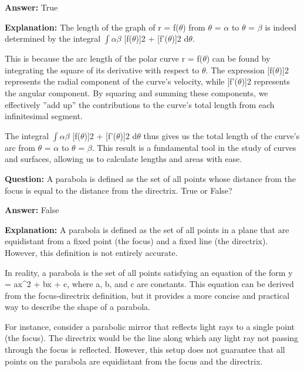 \documentclass{article}
\begin{document}
                \textbf{Answer:} True

                \textbf{Explanation:} The length of the graph of r = f(\ensuremath{\theta}) from \ensuremath{\theta} = \ensuremath{\alpha} to \ensuremath{\theta} = \ensuremath{\beta} is indeed determined by the integral \ensuremath{\int}\ensuremath{\alpha}\ensuremath{\beta} [f(\ensuremath{\theta})]2 + [f'(\ensuremath{\theta})]2 d\ensuremath{\theta}.

This is because the arc length of the polar curve r = f(\ensuremath{\theta}) can be found by integrating the square of its derivative with respect to \ensuremath{\theta}. The expression [f(\ensuremath{\theta})]2 represents the radial component of the curve's velocity, while [f'(\ensuremath{\theta})]2 represents the angular component. By squaring and summing these components, we effectively ''add up'' the contributions to the curve's total length from each infinitesimal segment.

The integral \ensuremath{\int}\ensuremath{\alpha}\ensuremath{\beta} [f(\ensuremath{\theta})]2 + [f'(\ensuremath{\theta})]2 d\ensuremath{\theta} thus gives us the total length of the curve's arc from \ensuremath{\theta} = \ensuremath{\alpha} to \ensuremath{\theta} = \ensuremath{\beta}. This result is a fundamental tool in the study of curves and surfaces, allowing us to calculate lengths and areas with ease.
                
                \vspace{0.5cm} 
        
            
                \textbf {Question:} A parabola is defined as the set of all points whose distance from the focus is equal to the distance from the directrix. True or False?
                
                \textbf{Answer:} False

                \textbf{Explanation:} A parabola is defined as the set of all points in a plane that are equidistant from a fixed point (the focus) and a fixed line (the directrix). However, this definition is not entirely accurate.

In reality, a parabola is the set of all points satisfying an equation of the form y = ax{\textasciicircum}2 + bx + c, where a, b, and c are constants. This equation can be derived from the focus-directrix definition, but it provides a more concise and practical way to describe the shape of a parabola.

For instance, consider a parabolic mirror that reflects light rays to a single point (the focus). The directrix would be the line along which any light ray not passing through the focus is reflected. However, this setup does not guarantee that all points on the parabola are equidistant from the focus and the directrix.
\end{document}
